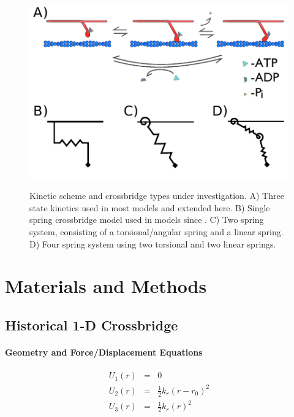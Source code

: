 \documentclass[]{article}
\begin{document}
\begin{figure}[H]
    \begin{center}
    \includegraphics{../imgs/XBCycle.pdf}
    \label{fig:xbtypes}
    \caption{{\small 
        Kinetic scheme and crossbridge types under investigation. 
        A) Three state kinetics used in most models and extended here. 
        B) Single spring crossbridge model used in models since \cite{Huxley1957e}. 
        C) Two spring system, consisting of a torsional/angular spring and a linear spring. 
        D) Four spring system using two torsional and two linear springs.}}
    \end{center}
\end{figure}


\section*{Materials and Methods}


\subsection*{Historical 1-D Crossbridge}



\paragraph*{Geometry and Force/Displacement Equations}


\begin{eqnarray}
\label{1sEnergy}
    U_1(r) & = & 0 \nonumber \\
    U_2(r) & = & \frac{1}{2}k_r (r-r_0)^2 \nonumber \\
    U_3(r) & = & \frac{1}{2}k_r (r)^2 \\
\end{eqnarray}
\end{document}
